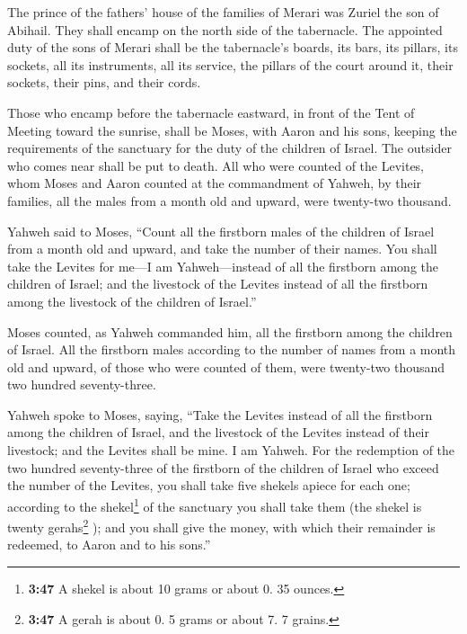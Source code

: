  The prince of the fathers' house of the families of
Merari was Zuriel the son of Abihail. They shall encamp on the north
side of the tabernacle.  The appointed duty of the sons
of Merari shall be the tabernacle's boards, its bars, its pillars, its
sockets, all its instruments, all its service,  the
pillars of the court around it, their sockets, their pins, and their
cords.

 Those who encamp before the tabernacle eastward, in
front of the Tent of Meeting toward the sunrise, shall be Moses, with
Aaron and his sons, keeping the requirements of the sanctuary for the
duty of the children of Israel. The outsider who comes near shall be put
to death.  All who were counted of the Levites, whom
Moses and Aaron counted at the commandment of Yahweh, by their families,
all the males from a month old and upward, were twenty-two thousand.

 Yahweh said to Moses, ``Count all the firstborn males of
the children of Israel from a month old and upward, and take the number
of their names.  You shall take the Levites for me---I am
Yahweh---instead of all the firstborn among the children of Israel; and
the livestock of the Levites instead of all the firstborn among the
livestock of the children of Israel.''

 Moses counted, as Yahweh commanded him, all the
firstborn among the children of Israel.  All the
firstborn males according to the number of names from a month old and
upward, of those who were counted of them, were twenty-two thousand two
hundred seventy-three.

 Yahweh spoke to Moses, saying,  ``Take
the Levites instead of all the firstborn among the children of Israel,
and the livestock of the Levites instead of their livestock; and the
Levites shall be mine. I am Yahweh.  For the redemption
of the two hundred seventy-three of the firstborn of the children of
Israel who exceed the number of the Levites,  you shall
take five shekels apiece for each one; according to the
shekel\footnote{\textbf{3:47} A shekel is about 10 grams or about 0. 35
  ounces.} of the sanctuary you shall take them (the shekel is twenty
gerahs\footnote{\textbf{3:47} A gerah is about 0. 5 grams or about 7. 7
  grains.} );  and you shall give the money, with which
their remainder is redeemed, to Aaron and to his sons.''

